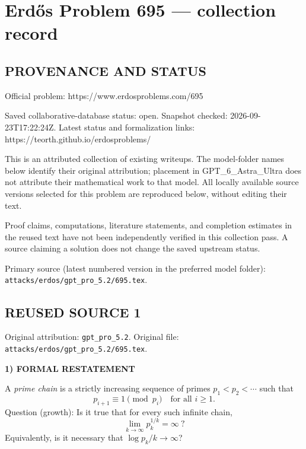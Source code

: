 \section*{Erd\H{o}s Problem 695 --- collection record}

\subsection*{PROVENANCE AND STATUS}
Official problem: https://www.erdosproblems.com/695

Saved collaborative-database status: open.
Snapshot checked: 2026-09-23T17:22:24Z.
Latest status and formalization links: https://teorth.github.io/erdosproblems/

This is an attributed collection of existing writeups. The model-folder names below identify their original attribution; placement in GPT\_6\_Astra\_Ultra does not attribute their mathematical work to that model. All locally available source versions selected for this problem are reproduced below, without editing their text.

Proof claims, computations, literature statements, and completion estimates in the reused text have not been independently verified in this collection pass. A source claiming a solution does not change the saved upstream status.

Primary source (latest numbered version in the preferred model folder): \texttt{attacks/erdos/gpt\_pro\_5.2/695.tex}.

\subsection*{REUSED SOURCE 1}
Original attribution: \texttt{gpt\_pro\_5.2}.
Original file: \texttt{attacks/erdos/gpt\_pro\_5.2/695.tex}.


\noindent\textbf{1) FORMAL RESTATEMENT}

A \emph{prime chain} is a strictly increasing sequence of primes $p_1<p_2<\cdots$ such that
\[
 p_{i+1}\equiv 1\pmod{p_i}\quad\text{for all }i\ge 1.
\]
Question (growth): Is it true that for every such infinite chain,
\[
\lim_{k\to\infty} p_k^{1/k}=\infty\ ?
\]
Equivalently, is it necessary that $\log p_k / k \to \infty$?

